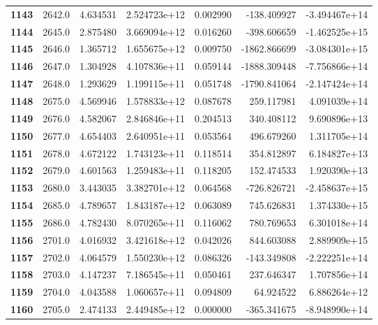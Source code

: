 \documentclass{report}[12pt]
\begin{document}
\begin{center}
\begin{tabular}{lrrrrrr}
\textbf{1143} &         2642.0 &   4.634531 &  2.524723e+12 &    0.002990 &  -138.409927 & -3.494467e+14 \\
\textbf{1144} &         2645.0 &   2.875480 &  3.669094e+12 &    0.016260 &  -398.606659 & -1.462525e+15 \\
\textbf{1145} &         2646.0 &   1.365712 &  1.655675e+12 &    0.009750 & -1862.866699 & -3.084301e+15 \\
\textbf{1146} &         2647.0 &   1.304928 &  4.107836e+11 &    0.059144 & -1888.309448 & -7.756866e+14 \\
\textbf{1147} &         2648.0 &   1.293629 &  1.199115e+11 &    0.051748 & -1790.841064 & -2.147424e+14 \\
\textbf{1148} &         2675.0 &   4.569946 &  1.578833e+12 &    0.087678 &   259.117981 &  4.091039e+14 \\
\textbf{1149} &         2676.0 &   4.582067 &  2.846846e+11 &    0.204513 &   340.408112 &  9.690896e+13 \\
\textbf{1150} &         2677.0 &   4.654403 &  2.640951e+11 &    0.053564 &   496.679260 &  1.311705e+14 \\
\textbf{1151} &         2678.0 &   4.672122 &  1.743123e+11 &    0.118514 &   354.812897 &  6.184827e+13 \\
\textbf{1152} &         2679.0 &   4.601563 &  1.259483e+11 &    0.118205 &   152.474533 &  1.920390e+13 \\
\textbf{1153} &         2680.0 &   3.443035 &  3.382701e+12 &    0.064568 &  -726.826721 & -2.458637e+15 \\
\textbf{1154} &         2685.0 &   4.789657 &  1.843187e+12 &    0.063089 &   745.626831 &  1.374330e+15 \\
\textbf{1155} &         2686.0 &   4.782430 &  8.070265e+11 &    0.116062 &   780.769653 &  6.301018e+14 \\
\textbf{1156} &         2701.0 &   4.016932 &  3.421618e+12 &    0.042026 &   844.603088 &  2.889909e+15 \\
\textbf{1157} &         2702.0 &   4.064579 &  1.550230e+12 &    0.086326 &  -143.349808 & -2.222251e+14 \\
\textbf{1158} &         2703.0 &   4.147237 &  7.186545e+11 &    0.050461 &   237.646347 &  1.707856e+14 \\
\textbf{1159} &         2704.0 &   4.043588 &  1.060657e+11 &    0.094809 &    64.924522 &  6.886264e+12 \\
\textbf{1160} &         2705.0 &   2.474133 &  2.449485e+12 &    0.000000 &  -365.341675 & -8.948990e+14 \\

\end{tabular}
\end{center}
\end{document}
